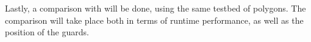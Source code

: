 Lastly, a comparison with \cite{DBLP:journals/corr/abs-2007-06920} will be done, using the same testbed of polygons. The comparison will take place both in terms of runtime performance, as well as the position of the guards. 

